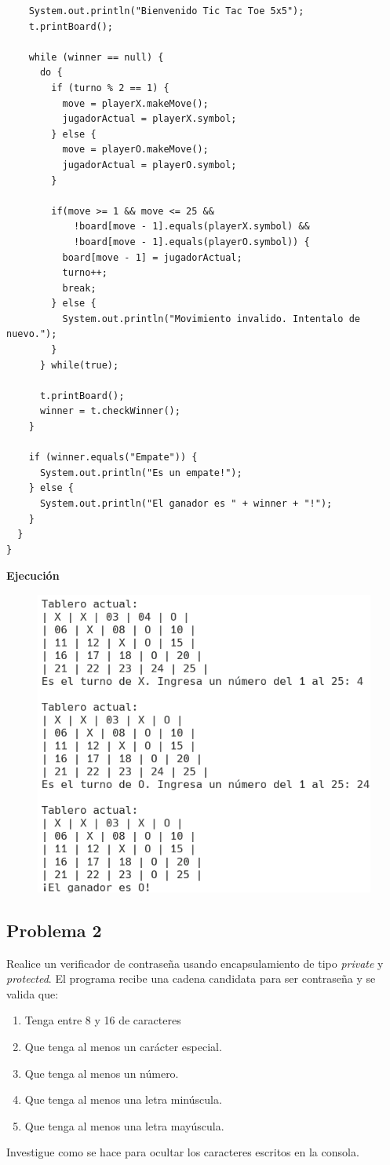 \documentclass[11pt, twocolumn]{article}
\begin{document}
\begin{lstlisting}
    System.out.println("Bienvenido Tic Tac Toe 5x5");
    t.printBoard();

    while (winner == null) {
      do {
        if (turno % 2 == 1) {
          move = playerX.makeMove();
          jugadorActual = playerX.symbol;
        } else {
          move = playerO.makeMove();
          jugadorActual = playerO.symbol;
        }
        
        if(move >= 1 && move <= 25 && 
            !board[move - 1].equals(playerX.symbol) && 
            !board[move - 1].equals(playerO.symbol)) {
          board[move - 1] = jugadorActual;
          turno++;
          break;
        } else {
          System.out.println("Movimiento invalido. Intentalo de nuevo.");
        }
      } while(true);

      t.printBoard();
      winner = t.checkWinner();
    }

    if (winner.equals("Empate")) {
      System.out.println("Es un empate!");
    } else {
      System.out.println("El ganador es " + winner + "!");
    }
  }
}  
  \end{lstlisting}
  
  \newpage
  \textbf{Ejecución}
  \begin{figure}[ht]
    \includegraphics[width=0.8\columnwidth, center]{P1.png}
  \end{figure}

  \subsection*{Problema 2}
  Realice un verificador de contraseña usando encapsulamiento de tipo \textit{private} y \textit{protected}. El programa recibe una cadena candidata para ser contraseña y se valida que:
  \begin{enumerate}[label=\alph*.]
    \item Tenga entre 8 y 16 de caracteres
    \item Que tenga al menos un carácter especial.
    \item Que tenga al menos un número.
    \item Que tenga al menos una letra minúscula.
    \item Que tenga al menos una letra mayúscula.
  \end{enumerate}
  Investigue como se hace para ocultar los caracteres escritos en la consola.
\end{document}
